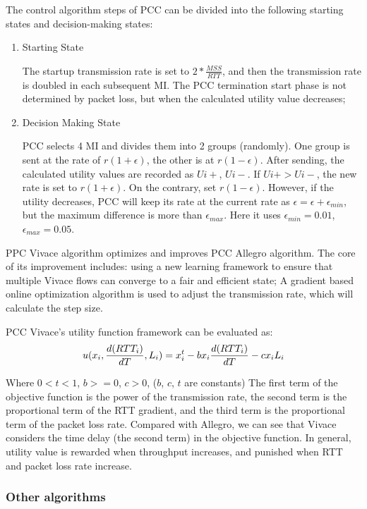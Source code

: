 \documentclass[conference]{IEEEtran}
\begin{document}
The control algorithm steps of PCC can be divided into the following starting states and decision-making states:
\begin{enumerate}
    \item Starting State

    \quad The startup transmission rate is set to $2*\frac{MSS}{RTT}$, and then the transmission rate is doubled in each subsequent MI. The PCC termination start phase is not determined by packet loss, but when the calculated utility value decreases;
    \item Decision Making State

    \quad PCC selects 4 MI and divides them into 2 groups (randomly). One group is sent at the rate of $r(1+\epsilon)$, the other is at $r(1-\epsilon)$. After sending, the calculated utility values are recorded as $Ui+$, $Ui-$. If $Ui+>Ui-$, the new rate is set to $r(1+\epsilon)$. On the contrary, set $r(1-\epsilon)$. However, if the utility decreases, PCC will keep its rate at the current rate as $\epsilon=\epsilon+\epsilon_{min}$, but the maximum difference is more than $\epsilon_{max}$. Here it uses $\epsilon_{min}= 0.01$, $\epsilon_{max}=0.05$.
\end{enumerate}

PPC Vivace algorithm\cite{a7} optimizes and improves PCC Allegro algorithm. The core of its improvement includes: using a new learning framework to ensure that multiple Vivace flows can converge to a fair and efficient state; A gradient based online optimization algorithm is used to adjust the transmission rate, which will calculate the step size.

PCC Vivace's utility function framework can be evaluated as: 
\begin{equation}
    u(x_i,\frac{d(RTT_i)}{dT},L_i)=x_i^t-bx_i\frac{d(RTT_i)}{dT}-cx_i\* L_i
\end{equation}

Where $0<t<1$, $b>=0$, $c>0$, ($b$, $c$, $t$ are constants) The first term of the objective function is the power of the transmission rate, the second term is the proportional term of the RTT gradient, and the third term is the proportional term of the packet loss rate. Compared with Allegro, we can see that Vivace considers the time delay (the second term) in the objective function. In general, utility value is rewarded when throughput increases, and punished when RTT and packet loss rate increase.

\subsubsection{Other algorithms}\quad
\end{document}

